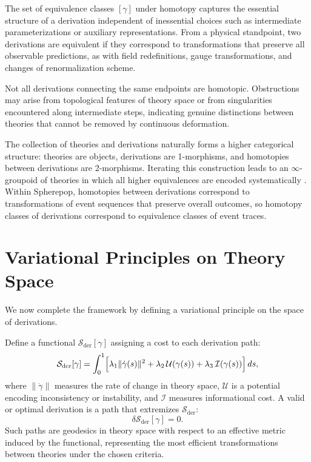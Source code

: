 \documentclass[12pt,a4paper]{article}
\theoremstyle{plain}
\theoremstyle{definition}
\theoremstyle{remark}
\begin{document}
The set of equivalence classes $[\gamma]$ under homotopy captures the
essential structure of a derivation independent of inessential choices
such as intermediate parameterizations or auxiliary representations.
From a physical standpoint, two derivations are equivalent if they
correspond to transformations that preserve all observable predictions,
as with field redefinitions, gauge transformations, and changes of
renormalization scheme.

Not all derivations connecting the same endpoints are homotopic.
Obstructions may arise from topological features of theory space or
from singularities encountered along intermediate steps, indicating
genuine distinctions between theories that cannot be removed by
continuous deformation.

The collection of theories and derivations naturally forms a higher
categorical structure: theories are objects, derivations are
1-morphisms, and homotopies between derivations are 2-morphisms.
Iterating this construction leads to an $\infty$-groupoid of theories
in which all higher equivalences are encoded systematically
\cite{LurieTFT}. Within Spherepop, homotopies between derivations
correspond to transformations of event sequences that preserve overall
outcomes, so homotopy classes of derivations correspond to equivalence
classes of event traces.

\section{Variational Principles on Theory Space}
\label{sec:variationaltheory}

We now complete the framework by defining a variational principle on
the space of derivations.

Define a functional $\mathcal{S}_{\mathrm{der}}[\gamma]$ assigning a
cost to each derivation path:
\begin{equation}
\mathcal{S}_{\mathrm{der}}[\gamma]
= \int_0^1
\Bigl[
\lambda_1 \|\dot{\gamma}(s)\|^2
+ \lambda_2\,\mathcal{U}(\gamma(s))
+ \lambda_3\,\mathcal{I}(\gamma(s))
\Bigr]\, ds,
\end{equation}
where $\|\dot{\gamma}\|$ measures the rate of change in theory space,
$\mathcal{U}$ is a potential encoding inconsistency or instability, and
$\mathcal{I}$ measures informational cost. A valid or optimal
derivation is a path that extremizes $\mathcal{S}_{\mathrm{der}}$:
\begin{equation}
\delta\mathcal{S}_{\mathrm{der}}[\gamma] = 0.
\end{equation}
Such paths are geodesics in theory space with respect to an effective
metric induced by the functional, representing the most efficient
transformations between theories under the chosen criteria.
\end{document}
